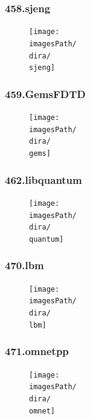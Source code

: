 \documentclass[12pt,a4paper]{article}
\newcommand{\imagesPath}{/home/nick/arch-ntua/ex02/graphs}
\newcommand{\sjeng}{458.sjeng.cslab_branch_predictors.out.pdf}
\newcommand{\gems}{459.GemsFDTD.cslab_branch_predictors.out.pdf}
\newcommand{\quantum}{462.libquantum.cslab_branch_predictors.out.pdf}
\newcommand{\lbm}{470.lbm.cslab_branch_predictors.out.pdf}
\newcommand{\omnet}{471.omnetpp.cslab_branch_predictors.out.pdf}
\newcommand{\dira}{4.1}
\begin{document}
			\subsubsection{458.sjeng}
				\begin{figure}[H]
					\begin{center}
						\texttt{[image: \\imagesPath/\\dira/\\sjeng]}
					\end{center}
				\end{figure}
			
			\subsubsection{459.GemsFDTD}
				\begin{figure}[H]
					\begin{center}
						\texttt{[image: \\imagesPath/\\dira/\\gems]}
					\end{center}
				\end{figure}
			
			\subsubsection{462.libquantum}
				\begin{figure}[H]
					\begin{center}
						\texttt{[image: \\imagesPath/\\dira/\\quantum]}
					\end{center}
				\end{figure}
			
			\subsubsection{470.lbm}
				\begin{figure}[H]
					\begin{center}
						\texttt{[image: \\imagesPath/\\dira/\\lbm]}
					\end{center}
				\end{figure}
			
			\subsubsection{471.omnetpp}
				\begin{figure}[H]
					\begin{center}
						\texttt{[image: \\imagesPath/\\dira/\\omnet]}
					\end{center}
				\end{figure}
			
\end{document}
